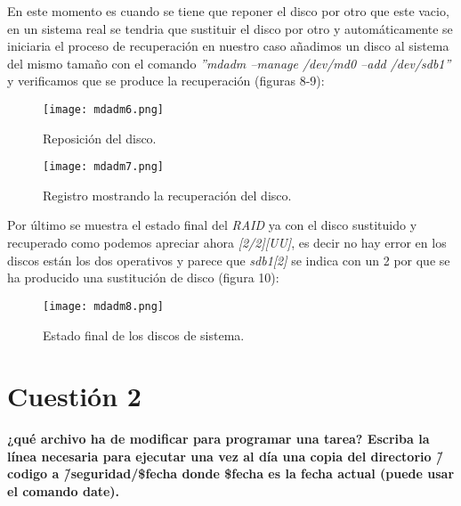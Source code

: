 \documentclass[a4paper, 11pt]{article} %
\begin{document}
En este momento es cuando se tiene que reponer el disco por otro que este vacio, en un sistema real se tendria que sustituir el disco por otro y automáticamente se iniciaria el proceso de recuperación en nuestro caso añadimos un disco al sistema del mismo tamaño con el comando \textit{''mdadm --manage /dev/md0 --add /dev/sdb1''} y verificamos que se produce la recuperación (figuras 8-9):
\begin{figure}[H]
\centering 
\texttt{[image: mdadm6.png]} 
\caption{Reposición del disco.} 
\label{contexto:figura} 
\end{figure}
\begin{figure}[H]
\centering 
\texttt{[image: mdadm7.png]} 
\caption{Registro mostrando la recuperación del disco.} 
\label{contexto:figura} 
\end{figure}
Por último se muestra el estado final del \textit{RAID} ya con el disco sustituido y recuperado como podemos apreciar ahora \textit{[2/2][UU]}, es decir no hay error en los discos están los dos operativos y parece que \textit{sdb1[2]} se indica con un 2 por que se ha producido una sustitución de disco (figura 10):
\begin{figure}[H]
\centering 
\texttt{[image: mdadm8.png]} 
\caption{Estado final de los discos de sistema.} 
\label{contexto:figura} 
\end{figure}

\section{Cuestión 2}
\textbf{¿qué archivo ha de modificar para programar una tarea? Escriba la línea necesaria para ejecutar una vez al día una copia del directorio \~/codigo a \~/seguridad/\$fecha donde \$fecha es la fecha actual (puede usar el comando date).}\\
\end{document}
